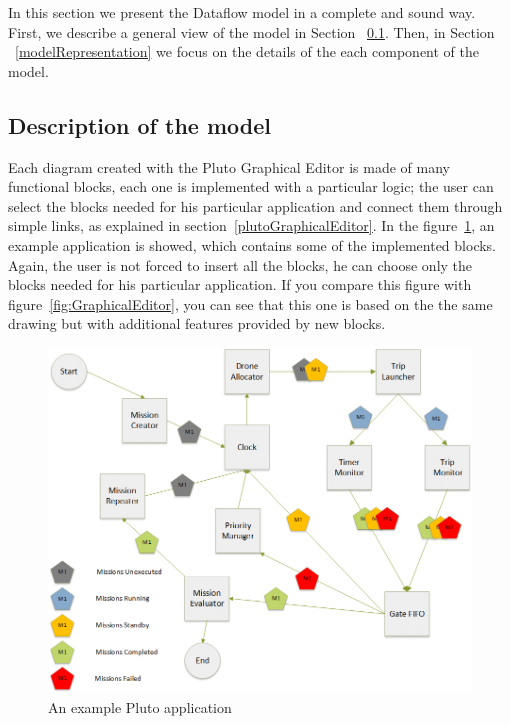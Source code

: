In this section we present the Dataflow model in a complete and sound way.
First, we describe a general view of the model in Section ~\ref{descriprionOfModel}. Then, in Section ~\ref{modelRepresentation} we focus on the details of the each component of the model.


\subsection{Description of the model}
\label{descriprionOfModel}

Each diagram created with the Pluto Graphical Editor is made of many functional blocks, each one is implemented with a particular logic; the user can select the blocks needed for his particular application and connect them through simple links, as explained in section~\ref{plutoGraphicalEditor}.
In the figure~\ref{fig:BlocksDiagram}, an example application is showed, which contains some of the implemented blocks.
Again, the user is not forced to insert all the blocks, he can choose only the blocks needed for his particular application.
If you compare this figure with figure~\ref{fig:GraphicalEditor}, you can see that this one is based on the the same drawing but with additional features provided by new blocks.
\\

\begin{figure}[htb]
  \centering
  \includegraphics[width=\linewidth]{pictures/BlocksDiagram.png}
  \caption{An example Pluto application}
  \label{fig:BlocksDiagram}
\end{figure}


